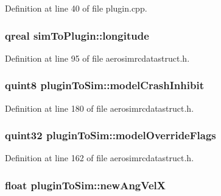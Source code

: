 \-Definition at line 40 of file plugin.\-cpp.

\hypertarget{group___aero_sim_r_c_ga3b47af6ee67e1149980bd672fce0f91d}{
\subsubsection[{longitude}]{\setlength{\rightskip}{0pt plus 5cm}qreal {\bf sim\-To\-Plugin\-::longitude}}}\label{group___aero_sim_r_c_ga3b47af6ee67e1149980bd672fce0f91d}


\-Definition at line 95 of file aerosimrcdatastruct.\-h.

\hypertarget{group___aero_sim_r_c_gac766c17be7565d11f169ec43dac2113d}{
\subsubsection[{model\-Crash\-Inhibit}]{\setlength{\rightskip}{0pt plus 5cm}quint8 {\bf plugin\-To\-Sim\-::model\-Crash\-Inhibit}}}\label{group___aero_sim_r_c_gac766c17be7565d11f169ec43dac2113d}


\-Definition at line 180 of file aerosimrcdatastruct.\-h.

\hypertarget{group___aero_sim_r_c_ga0fc062ffe3e17dd8ae14a181fbb50c1f}{
\subsubsection[{model\-Override\-Flags}]{\setlength{\rightskip}{0pt plus 5cm}quint32 {\bf plugin\-To\-Sim\-::model\-Override\-Flags}}}\label{group___aero_sim_r_c_ga0fc062ffe3e17dd8ae14a181fbb50c1f}


\-Definition at line 162 of file aerosimrcdatastruct.\-h.

\hypertarget{group___aero_sim_r_c_gafd7e1d21996abb68824a65505d845744}{
\subsubsection[{new\-Ang\-Vel\-X}]{\setlength{\rightskip}{0pt plus 5cm}float {\bf plugin\-To\-Sim\-::new\-Ang\-Vel\-X}}}\label{group___aero_sim_r_c_gafd7e1d21996abb68824a65505d845744}


